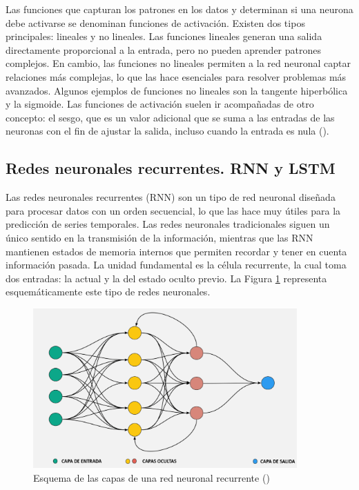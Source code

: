 \documentclass[12pt,a4paper]{report}
\begin{document}
Las funciones que capturan los patrones en los datos y determinan si una neurona debe activarse se denominan funciones de activación. Existen dos tipos principales: lineales y no lineales. Las funciones lineales generan una salida directamente proporcional a la entrada, pero no pueden aprender patrones complejos. En cambio, las funciones no lineales permiten a la red neuronal captar relaciones más complejas, lo que las hace esenciales para resolver problemas más avanzados. Algunos ejemplos de funciones no lineales son la tangente hiperbólica y la sigmoide. Las funciones de activación suelen ir acompañadas de otro concepto: el sesgo, que es un valor adicional que se suma a las entradas de las neuronas con el fin de ajustar la salida, incluso cuando la entrada es nula (\cite{jacomeGarcia2024}).


\subsection{Redes neuronales recurrentes. RNN y LSTM}

Las redes neuronales recurrentes (RNN) son un tipo de red neuronal diseñada para procesar datos con un orden secuencial, lo que las hace muy útiles para la predicción de series temporales. Las redes neuronales tradicionales siguen un único sentido en la transmisión de la información, mientras que las RNN mantienen estados de memoria internos que permiten recordar y tener en cuenta información pasada. La unidad fundamental es la célula recurrente, la cual toma dos entradas: la actual y la del estado oculto previo. La Figura \ref{fig:RNN} representa esquemáticamente este tipo de redes neuronales.

\begin{figure}[H]
    \centering
    \includegraphics[width=0.9\textwidth]{Images/tfm-2.10.png}
    \caption{Esquema de las capas de una red neuronal recurrente (\cite{fouzan2023understanding})}
    \label{fig:RNN}
\end{figure}
\end{document}
